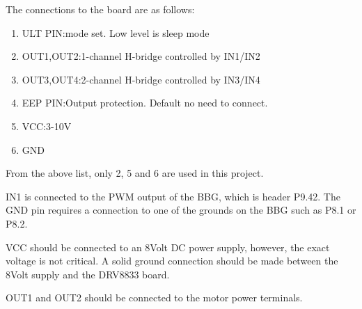 The connections to the board are as follows:

\begin{enumerate}
\item ULT PIN:mode set. Low level is sleep mode
\item OUT1,OUT2:1-channel H-bridge controlled by IN1/IN2
\item OUT3,OUT4:2-channel H-bridge controlled by IN3/IN4
\item EEP PIN:Output protection. Default no need to connect.
\item VCC:3-10V
\item GND
\end{enumerate}

From the above list, only 2, 5 and 6 are used in this project.

IN1 is connected to the PWM output of the BBG, which is header P9.42.
The GND pin requires a connection to one of the grounds on the BBG such as P8.1 or P8.2.

VCC should be connected to an 8Volt DC power supply, however, the exact voltage is not critical.  A solid ground connection should be made between the 8Volt supply and the DRV8833 board.

OUT1 and OUT2 should be connected to the motor power terminals.

